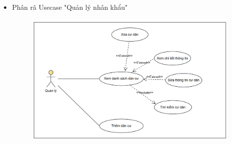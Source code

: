 \documentclass{article}
\begin{document}
\begin{itemize}
    \item Phân rã Usecase "Quản lý nhân khẩu"
    \begin{figure}[H]
        \centering
        \includegraphics[width=1\textwidth]{Ảnh chương 2/Nhân khẩu.png}
    \end{figure}
    

\end{itemize}
\end{document}

